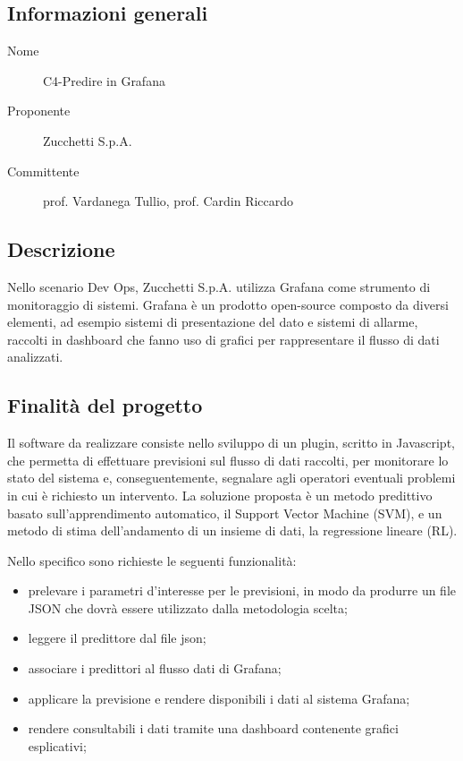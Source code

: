 \documentclass[../studio-di-fattibilita.tex]{subfiles}
\begin{document}
  \subsection{Informazioni generali}%
  \label{subsec:informazioni_generali}
  \begin{description}
    \item[Nome] C4-Predire in Grafana
    \item[Proponente] Zucchetti S.p.A.
    \item[Committente] prof. Vardanega Tullio, prof. Cardin Riccardo
  \end{description}


  \subsection{Descrizione}%
  \label{subsec:descrizione}
  Nello scenario Dev Ops, Zucchetti S.p.A. utilizza Grafana come strumento di monitoraggio di sistemi.
  Grafana è un prodotto open-source composto da diversi elementi, ad esempio sistemi di presentazione del dato e sistemi di allarme, raccolti in dashboard che fanno uso di grafici per rappresentare il flusso di dati analizzati.


  \subsection{Finalità del progetto}%
  \label{subsec:finalita_del_progetto}
  Il software da realizzare consiste nello sviluppo di un plugin, scritto in Javascript, che permetta di effettuare previsioni sul flusso di dati raccolti, per monitorare lo stato del sistema e, conseguentemente, segnalare agli operatori eventuali problemi in cui è richiesto un intervento. La soluzione proposta è un metodo predittivo basato sull'apprendimento automatico, il Support Vector Machine (SVM), e un metodo di stima dell'andamento di un insieme di dati, la regressione lineare (RL).

  Nello specifico sono richieste le seguenti funzionalità:
  \begin{itemize}
    \item prelevare i parametri d'interesse per le previsioni, in modo da produrre un file JSON che dovrà essere utilizzato dalla metodologia scelta;
    \item leggere il predittore dal file json;
    \item associare i predittori al flusso dati di Grafana;
    \item applicare la previsione e rendere disponibili i dati al sistema Grafana;
    \item rendere consultabili i dati tramite una dashboard contenente grafici esplicativi;
  \end{itemize}
\end{document}
